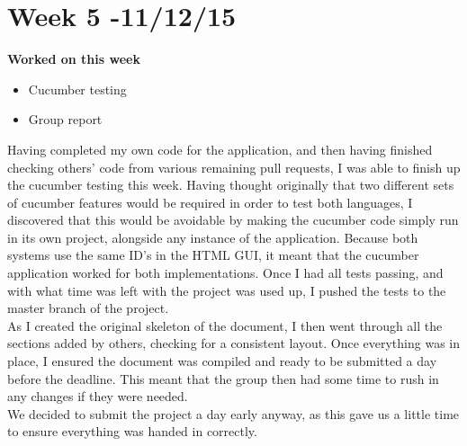\section{Week 5 -11/12/15}
\textbf{Worked on this week}
\begin{itemize}
\item Cucumber testing
\item Group report
\end{itemize}
Having completed my own code for the application, and then having finished checking others' code from various remaining pull requests, I was able to finish up the cucumber testing this week. Having thought originally that two different sets of cucumber features would be required in order to test both languages, I discovered that this would be avoidable by making the cucumber code simply run in its own project, alongside any instance of the application. Because both systems use the same ID's in the HTML GUI, it meant that the cucumber application worked for both implementations. Once I had all tests passing, and with what time was left with the project was used up, I pushed the tests to the master branch of the project.\\
As I created the original skeleton of the document, I then went through all the sections added by others, checking for a consistent layout. Once everything was in place, I ensured the document was compiled and ready to be submitted a day before the deadline. This meant that the group then had some time to rush in any changes if they were needed. \\
We decided to submit the project a day early anyway, as this gave us a little time to ensure everything was handed in correctly.
